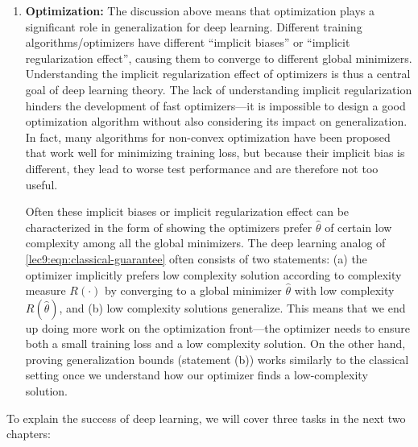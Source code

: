 \begin{enumerate}
\item {\bf Optimization:} The discussion above means that optimization plays a significant role in generalization for deep learning. Different training algorithms/optimizers have different ``implicit biases'' or ``implicit regularization effect'', causing them to converge to different global minimizers. Understanding the implicit regularization effect of optimizers is thus a central goal of deep learning theory. The lack of understanding implicit regularization hinders the development of fast optimizers---it is impossible to design a good optimization algorithm without also considering its impact on generalization. In fact, many algorithms for non-convex optimization have been proposed that work well for minimizing training loss, but because their implicit bias is different, they lead to worse test performance and are therefore not too useful.
    
Often these implicit biases or implicit regularization effect can be characterized in the form of showing the optimizers prefer $\hat\theta$ of certain low complexity among all the global minimizers. The deep learning analog of \eqref{lec9:eqn:classical-guarantee} often consists of two statements: (a) the optimizer implicitly prefers low complexity solution according to complexity measure $R(\cdot)$ by converging to a global minimizer $\hat{\theta}$ with low complexity $R(\hat{\theta})$, and (b) low complexity solutions generalize. This means that we end up doing more work on the optimization front---the optimizer needs to ensure both a small training loss and a low complexity solution. On the other hand, proving generalization bounds (statement (b)) works similarly to the classical setting once we understand how our optimizer finds a low-complexity solution.
    
\end{enumerate}

To explain the success of deep learning, we will cover three tasks in the next two chapters:

